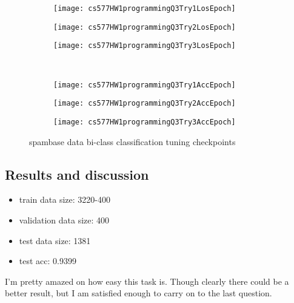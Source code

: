 \documentclass{article}
\begin{document}
\begin{figure}[h!]
    \centering
    \begin{subfigure}{.32\textwidth}
        \centering
        \texttt{[image: cs577HW1programmingQ3Try1LosEpoch]}
    \end{subfigure}
    \begin{subfigure}{.32\textwidth}
        \centering
        \texttt{[image: cs577HW1programmingQ3Try2LosEpoch]}
    \end{subfigure}
    \begin{subfigure}{.32\textwidth}
        \centering
        \texttt{[image: cs577HW1programmingQ3Try3LosEpoch]}
    \end{subfigure}\\
    \begin{subfigure}{.32\textwidth}
        \centering
        \texttt{[image: cs577HW1programmingQ3Try1AccEpoch]}
    \end{subfigure}
    \begin{subfigure}{.32\textwidth}
        \centering
        \texttt{[image: cs577HW1programmingQ3Try2AccEpoch]}
    \end{subfigure}
    \begin{subfigure}{.32\textwidth}
        \centering
        \texttt{[image: cs577HW1programmingQ3Try3AccEpoch]}
    \end{subfigure}
    \caption{spambase data bi-class classification tuning checkpoints}
    \label{fig:spambaseBiClass}
\end{figure}


\subsection*{Results and discussion}

\begin{itemize}
    \item train data size: 3220-400
    \item validation data size: 400
    \item test data size: 1381
    \item test acc: 0.9399
\end{itemize}

I'm pretty amazed on how easy this task is. Though clearly there could be a better result, but I am satisfied enough to carry on to the last question.
\end{document}
